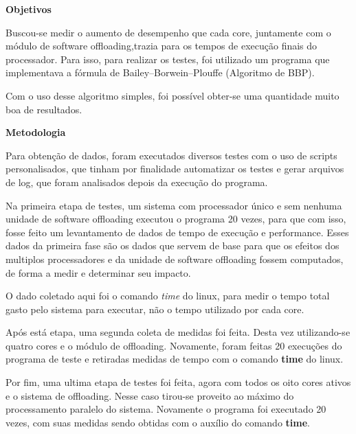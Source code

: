 \documentclass[10pt,a4paper]{report}
\begin{document}
\begin{Large}
\textbf{Objetivos}
\newline
\end{Large}

    Buscou-se medir o aumento de desempenho que cada core, juntamente com o módulo de software offloading,trazia para os tempos de execução finais do processador. Para isso, para realizar os testes, foi utilizado um programa que implementava a fórmula de Bailey–Borwein–Plouffe (Algoritmo de BBP).
    
    Com o uso desse algoritmo simples, foi possível obter-se uma quantidade muito boa de resultados.
\newline
\newline

\begin{Large}
\textbf{Metodologia}
\newline
\end{Large}

    Para obtenção de dados, foram executados diversos testes com o uso de scripts personalisados, que tinham por finalidade automatizar os testes e gerar arquivos de log, que foram analisados depois da execução do programa.
    
    Na primeira etapa de testes, um sistema com processador único e sem nenhuma unidade de software offloading executou o programa 20 vezes, para que com isso, fosse feito um levantamento de dados de tempo de execução e performance. Esses dados da primeira fase são os dados que servem de base para que os efeitos dos multiplos processadores e da unidade de software offloading fossem computados, de forma a medir e determinar seu impacto.
    
    O dado coletado aqui foi o comando \textit{time} do linux, para medir o tempo total gasto pelo sistema para executar, não o tempo utilizado por cada core.
    
        Após está etapa, uma segunda coleta de medidas foi feita. Desta vez utilizando-se quatro cores e o módulo de offloading. Novamente, foram feitas 20 execuções do programa de teste e retiradas medidas de tempo com o comando \textbf{time} do linux.
    
    Por fim, uma ultima etapa de testes foi feita, agora com todos os oito cores ativos e o sistema de offloading. Nesse caso tirou-se proveito ao máximo do processamento paralelo do sistema. Novamente o programa foi executado 20 vezes, com suas medidas sendo obtidas com o auxílio do comando \textbf{time}.
    
\end{document}
